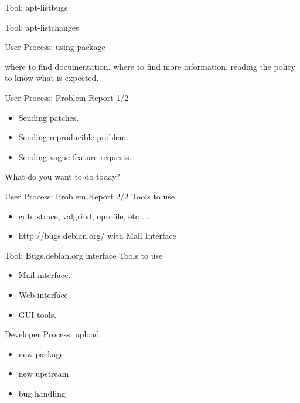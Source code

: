 \documentclass[cjk,dvipdfm,12pt]{beamer}
\begin{document}
\begin{frame}{Tool: apt-listbugs}
\end{frame}

\begin{frame}{Tool: apt-listchanges}
\end{frame}

\begin{frame}{User Process: using package}

where to find documentation.
where to find more information.
reading the policy to know what is expected.

\end{frame}

\begin{frame}{User Process: Problem Report 1/2}
\begin{itemize}
 \item Sending patches.
 \item Sending reproducible problem.
 \item Sending vague feature requests.
\end{itemize}

What do you want to do today?
\end{frame}

\begin{frame}{User Process: Problem Report 2/2}
Tools to use 
\begin{itemize}
 \item gdb, strace, valgrind, oprofile, etc ... 
 \item http://bugs.debian.org/ with Mail Interface
\end{itemize} 
\end{frame}

\begin{frame}{Tool: Bugs.debian.org interface}
Tools to use 
\begin{itemize}
 \item Mail interface.
 \item Web interface.
 \item GUI tools.
\end{itemize} 
\end{frame}

\begin{frame}{Developer Process: upload}
 \begin{itemize}
  \item new package 
  \item new upstream
  \item bug handling 
 \end{itemize}
\end{frame}
\end{document}
